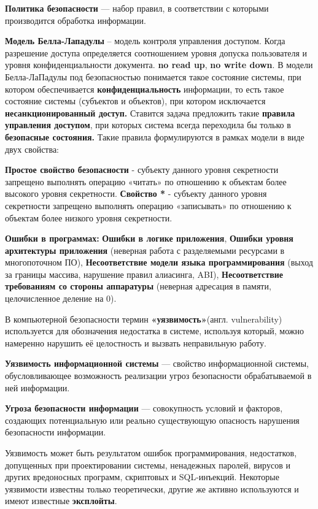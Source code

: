 
\textbf{Политика безопасности} — набор правил, в соответствии с которыми производится обработка информации.

\textbf{Модель Белла-Лападулы} – модель контроля управления доступом.  Когда разрешение доступа определяется соотношением уровня допуска пользователя и уровня конфиденциальности документа. \textbf{no read up}, \textbf{no write down}. В модели Белла-ЛаПадулы под безопасностью понимается такое состояние системы, при котором обеспечивается \textbf{конфиденциальность} информации, то есть такое состояние системы (субъектов и объектов), при котором исключается \textbf{несанкционированный доступ.} Ставится задача предложить такие \textbf{правила управления доступом}, при которых система всегда переходила бы только в \textbf{безопасные состояния.} Такие правила формулируются в рамках модели в виде двух свойства:

\textbf{Простое свойство безопасности} - субъекту данного уровня секретности запрещено выполнять операцию «читать» по отношению к объектам более высокого уровня  секретности.
\textbf{Свойство *} - субъекту данного уровня секретности запрещено выполнять операцию «записывать» по отношению к объектам более низкого уровня  секретности.

\textbf{Ошибки в программах:}
\textbf{Ошибки в логике приложения}, \textbf{Ошибки уровня архитектуры приложения}
(неверная работа с разделяемыми ресурсами в многопоточном ПО), \textbf{Несоответствие модели языка программирования}
(выход за границы массива, нарушение правил алиасинга, ABI),\textbf{ Несоответствие требованиям со стороны аппаратуры}
(неверная адресация в памяти, целочисленное деление на 0).

В компьютерной безопасности термин \textbf{«уязвимость»}(англ. vulnerability) используется для обозначения недостатка в системе, используя который, можно намеренно нарушить её целостность и вызвать неправильную работу. 

\textbf{Уязвимость информационной системы} —
свойство информационной системы,
обусловливающее возможность
реализации угроз безопасности
обрабатываемой в ней информации.

\textbf{Угроза безопасности информации} —
совокупность условий и факторов,
создающих потенциальную или реально
существующую опасность нарушения
безопасности информации.

Уязвимость может быть результатом ошибок программирования, недостатков, допущенных при проектировании системы, ненадежных паролей, вирусов и других вредоносных программ, скриптовых и SQL-инъекций. Некоторые уязвимости известны только теоретически, другие же активно используются и имеют известные \textbf{эксплойты}.

